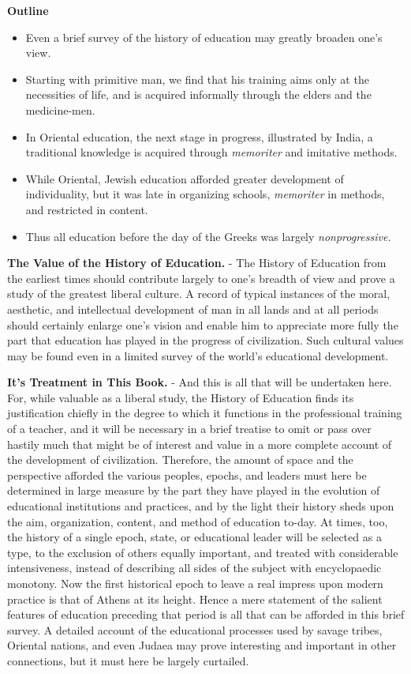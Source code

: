 \documentclass[
]{book}
\providecommand{\tightlist}{%
  \setlength{\itemsep}{0pt}\setlength{\parskip}{0pt}}
\begin{document}
\textbf{Outline}

\begin{itemize}
\tightlist
\item
  Even a brief survey of the history of education may greatly broaden one's view.
\item
  Starting with primitive man, we find that his training aims only at the necessities of life, and is acquired informally through the elders and the medicine-men.
\item
  In Oriental education, the next stage in progress, illustrated by India, a traditional knowledge is acquired through \emph{memoriter} and imitative methods.
\item
  While Oriental, Jewish education afforded greater development of individuality, but it was late in organizing schools, \emph{memoriter} in methods, and restricted in content.
\item
  Thus all education before the day of the Greeks was largely \emph{nonprogressive.}
\end{itemize}

\textbf{The Value of the History of Education.} - The History of Education from the earliest times should contribute largely to one's breadth of view and prove a study of the greatest liberal culture. A record of typical instances of the moral, aesthetic, and intellectual development of man in all lands and at all periods should certainly enlarge one's vision and enable him to appreciate more fully the part that education has played in the progress of civilization. Such cultural values may be found even in a limited survey of the world's educational development.

\textbf{It's Treatment in This Book.} - And this is all that will be undertaken here. For, while valuable as a liberal study, the History of Education finds its justification chiefly in the degree to which it functions in the professional training of a teacher, and it will be necessary in a brief treatise to omit or pass over hastily much that might be of interest and value in a more complete account of the development of civilization. Therefore, the amount of space and the perspective afforded the various peoples, epochs, and leaders must here be determined in large measure by the part they have played in the evolution of educational institutions and practices, and by the light their history sheds upon the aim, organization, content, and method of education to-day. At times, too, the history of a single epoch, state, or educational leader will be selected as a type, to the exclusion of others equally important, and treated with considerable intensiveness, instead of describing all sides of the subject with encyclopaedic monotony. Now the first historical epoch to leave a real impress upon modern practice is that of Athens at its height. Hence a mere statement of the salient features of education preceding that period is all that can be afforded in this brief survey. A detailed account of the educational processes used by savage tribes, Oriental nations, and even Judaea may prove interesting and important in other connections, but it must here be largely curtailed.
\end{document}
